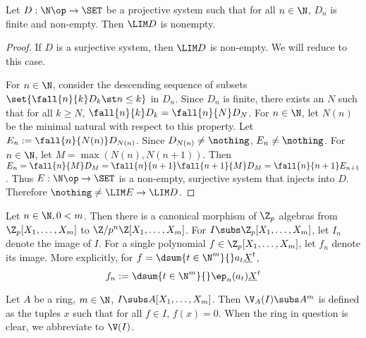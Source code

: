 \begin{prop}
  
  Let $D : \N\op \to \SET$ be a projective system 
  such that for all $n\in \N$, $D_n$ is finite and non-empty. 
  Then $\LIM D $ is nonempty. 
\end{prop}
\begin{proof}
  If $D$ is a surjective system, then $\LIM D $ is non-empty. 
  We will reduce to this case. 

  For $n \in \N$, 
  consider the descending sequence of subsets 
  $\set{\fall{n}{k} D_k \st n \leq k}$ in $D_n$. 
  Since $D_n$ is finite, 
  there exists an $N$ such that for all $k \geq N$, 
  $\fall{n}{k} D_k = \fall{n}{N} D_N$.
  For $n \in \N$, 
  let $N(n)$ be the minimal natural with respect to this property. 
  Let $E_n := \fall{n}{N(n)} D_{N(n)}$.
  Since $D_{N(n)} \neq \nothing$, $E_n \neq \nothing$. 
  For $n \in \N$, 
  let $M = \max(N(n),N(n+1))$. 
  Then $E_n = \fall{n}{M} D_M = \fall{n}{n+1}\fall{n+1}{M} D_M 
  = \fall{n}{n+1} E_{n+1}$. 
  Thus $E : \N\op \to \SET$ is a non-empty, surjective system that
  injects into $D$. 
  Therefore $\nothing \neq \LIM E \to \LIM D$.
\end{proof}

\begin{notation}
  Let $n \in \N, 0 < m$. 
  Then there is a canonical morphism of $\Z_p$ algebras from 
  $\Z_p[X_1,\dots,X_m]$ to $\Z/p^n\Z[X_1,\dots,X_m]$.
  For $I \subs \Z_p[X_1,\dots,X_m]$,
  let $I_n$ denote the image of $I$.
  For a single polynomial $f \in \Z_p[X_1,\dots,X_m]$,
  let $f_n$ denote its image. 
  More explicitly, for $f = \dsum{t \in \N^m}{} a_t \underline{X}^t$,
  \[
    f_n := \dsum{t \in \N^m}{} \ep_n(a_t) \underline{X}^t
  \]
\end{notation}

\begin{dfn}[Vanishing]
  
  Let $A$ be a ring, $m \in \N$, $I \subs A[X_1,\dots,X_m]$. 
  Then $\V_A(I) \subs A^m$ is defined as the tuples $x$ such that 
  for all $f \in I$, $f(x) = 0$. 
  When the ring in question is clear, 
  we abbreviate to $\V(I)$. 
\end{dfn}

